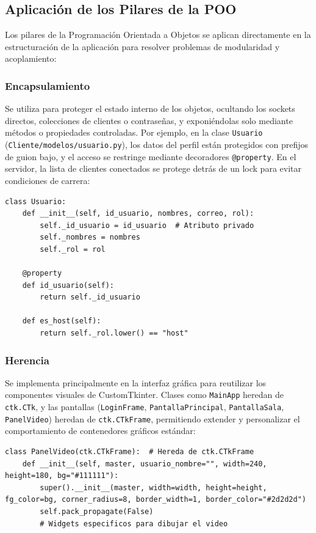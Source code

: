 \documentclass[12pt,a4paper]{article}
\begin{document}
\subsection{Aplicaci\'on de los Pilares de la POO}

Los pilares de la Programaci\'on Orientada a Objetos se aplican directamente en la estructuraci\'on de la aplicaci\'on para resolver problemas de modularidad y acoplamiento:

\subsubsection{Encapsulamiento}
Se utiliza para proteger el estado interno de los objetos, ocultando los sockets directos, colecciones de clientes o contrase\~nas, y exponi\'endolas solo mediante m\'etodos o propiedades controladas.
Por ejemplo, en la clase \texttt{Usuario} (\texttt{Cliente/modelos/usuario.py}), los datos del perfil est\'an protegidos con prefijos de guion bajo, y el acceso se restringe mediante decoradores \texttt{@property}. En el servidor, la lista de clientes conectados se protege detr\'as de un lock para evitar condiciones de carrera:

\begin{lstlisting}
class Usuario:
    def __init__(self, id_usuario, nombres, correo, rol):
        self._id_usuario = id_usuario  # Atributo privado
        self._nombres = nombres
        self._rol = rol

    @property
    def id_usuario(self):
        return self._id_usuario

    def es_host(self):
        return self._rol.lower() == "host"
\end{lstlisting}

\subsubsection{Herencia}
Se implementa principalmente en la interfaz gr\'afica para reutilizar los componentes visuales de CustomTkinter. Clases como \texttt{MainApp} heredan de \texttt{ctk.CTk}, y las pantallas (\texttt{LoginFrame}, \texttt{PantallaPrincipal}, \texttt{PantallaSala}, \texttt{PanelVideo}) heredan de \texttt{ctk.CTkFrame}, permitiendo extender y personalizar el comportamiento de contenedores gr\'aficos est\'andar:

\begin{lstlisting}
class PanelVideo(ctk.CTkFrame):  # Hereda de ctk.CTkFrame
    def __init__(self, master, usuario_nombre="", width=240, height=180, bg="#111111"):
        super().__init__(master, width=width, height=height, fg_color=bg, corner_radius=8, border_width=1, border_color="#2d2d2d")
        self.pack_propagate(False)
        # Widgets especificos para dibujar el video
\end{lstlisting}
\end{document}
